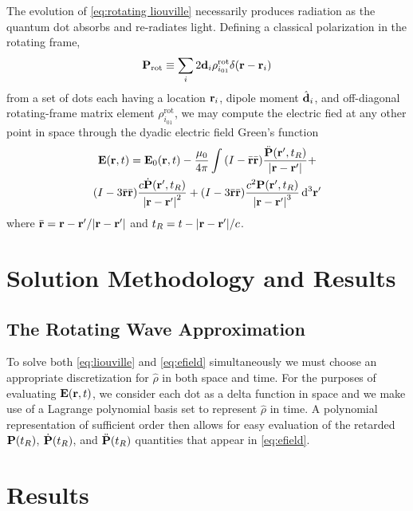 \documentclass[conference]{IEEEtran}
\begin{document}
The evolution of \cref{eq:rotating liouville} necessarily produces radiation as the quantum dot absorbs and re-radiates light.
Defining a classical polarization in the rotating frame,
\begin{equation}
  \vb{P}_\text{rot} \equiv \sum_i 2\vb{d}_i \rho_{i_{01}}^\text{rot} \delta(\vb{r} - \vb{r}_i)
  \label{eq:polarization}
\end{equation}
from a set of dots each having a location $\vb{r}_i$, dipole moment $\hat{\vb{d}}_i$, and off-diagonal rotating-frame matrix element $\rho_{i_{01}}^\text{rot}$, we may compute the electric fied at any other point in space through the dyadic electric field Green's function
\begin{equation}
  \begin{gathered}
  \vb{E}(\vb{r}, t) = \vb{E}_0(\vb{r}, t) - \frac{\mu_0}{4\pi} \int 
      \qty(I - \bar{\vb{r}}\bar{\vb{r}}) \frac{\ddot{\vb{P}}(\vb{r}', t_R)}{\abs{\vb{r} - \vb{r}'}} + \\ 
      \qty(I - 3\bar{\vb{r}}\bar{\vb{r}}) \frac{c \dot{\vb{P}}(\vb{r}', t_R)}{\abs{\vb{r} - \vb{r}'}^2} + 
      \qty(I - 3\bar{\vb{r}}\bar{\vb{r}}) \frac{c^2 \vb{P}(\vb{r}', t_R)}{\abs{\vb{r} - \vb{r}'}^3}  
  \dd[3]{\vb{r}'}
  \label{eq:efield}
  \end{gathered}
\end{equation}
where $\bar{\vb{r}} = \vb{r} - \vb{r}'/\abs{\vb{r} - \vb{r}'}$ and $t_R = t - \abs{\vb{r} - \vb{r}'}/c$.

\section{Solution Methodology and Results}
\subsection{The Rotating Wave Approximation}
To solve both \cref{eq:liouville} and \cref{eq:efield} simultaneously we must choose an appropriate discretization for $\hat{\rho}$ in both space and time.
For the purposes of evaluating $\vb{E}(\vb{r},t)$, we consider each dot as a delta function in space and we make use of a Lagrange polynomial basis set to represent $\hat{\rho}$ in time.
A polynomial representation of sufficient order then allows for easy evaluation of the retarded $\vb{P}(t_R)$, $\dot{\vb{P}}(t_R)$, and $\ddot{\vb{P}}(t_R)$ quantities that appear in \cref{eq:efield}.


\section{Results}
\end{document}
